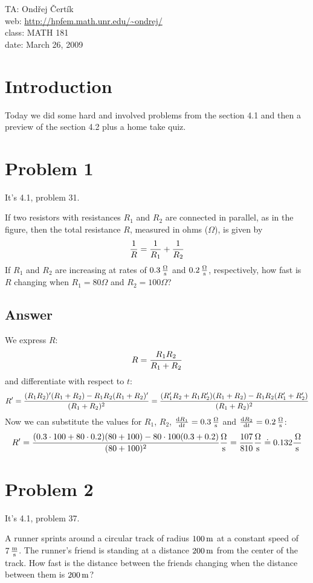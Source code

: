 \documentclass[10pt]{article}
\begin{document}
\noindent TA: Ondřej Čertík\\
web: \url{http://hpfem.math.unr.edu/~ondrej/}\\
class: MATH 181\\
date: March 26, 2009

\section{Introduction}

Today we did some hard and involved problems from the section 4.1 and then a
preview of the section 4.2 plus a home take quiz.

\section{Problem 1}

It's 4.1, problem 31.

If two resistors with resistances $R_1$ and $R_2$ are connected in parallel, as
in the figure, then the total resistance $R$, measured in ohms ($\Omega$), is
given by
$$
{1\over R} = {1\over R_1} + {1\over R_2}
$$
If $R_1$ and $R_2$ are increasing at rates of
$0.3\rm\,{\Omega\over s}$
and
$0.2\rm\,{\Omega\over s}$,
respectively, how fast is $R$ changing when $R_1=80\Omega$ and $R_2=100\Omega$?

\subsection*{Answer}

We express $R$:
$$R = {R_1R_2\over R_1+R_2}$$
and differentiate with respect to $t$:
$$R' =
{(R_1R_2)'(R_1+R_2) - R_1R_2(R_1+R_2)'\over (R_1+R_2)^2}=
{(R_1'R_2+R_1R_2')(R_1+R_2) - R_1R_2(R_1'+R_2')\over (R_1+R_2)^2}
$$
Now we can substitute the values for $R_1$, $R_2$,
${{\rm d} R_1\over {\rm d} t}=0.3\rm\,{\Omega\over s}$
and
${{\rm d} R_2\over {\rm d} t}=0.2\rm\,{\Omega\over s}$:
$$R'=
{(0.3\cdot 100+80\cdot0.2)(80+100) - 80\cdot100(0.3+0.2)\over (80+100)^2}
{\rm\Omega\over s}
=
{107\over810}
{\rm\Omega\over s}
\doteq
0.132
{\rm\,\Omega\over s}
$$

\section{Problem 2}

It's 4.1, problem 37.

A runner sprints around a circular track of radius $100\rm\,m$ at a constant
speed of $7\rm\,{m\over s}$. The runner's friend is standing at a distance
$200\rm\,m$ from the center of the track. How fast is the distance between the
friends changing when the distance between them is $200\rm\,m$?
\end{document}
